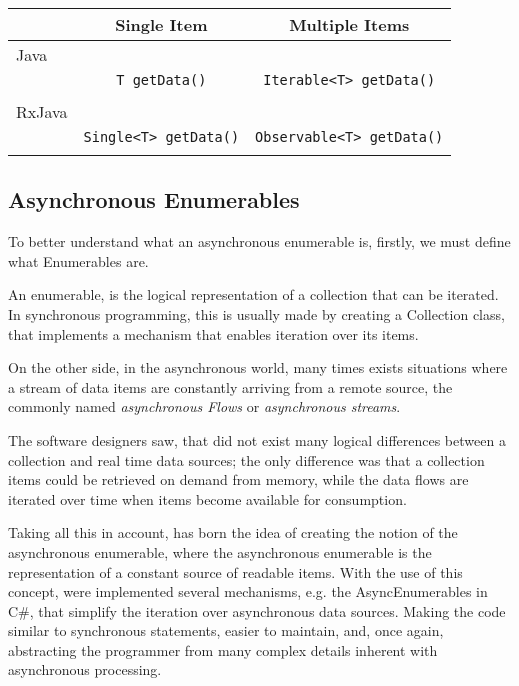 \begin{center}
\begin{tabular}{ |l|c|c| }
\hline
	& Single Item & Multiple Items \\ \hline
	Java & & \\ 
& \texttt{T getData()}  & \texttt{Iterable<T> getData()} \\
	& & \\
	\hline
	RxJava & & \\ 
& \texttt{Single<T> getData()} & \texttt{Observable<T> getData()} \\
	& & \\
	\hline
\end{tabular}
\end{center}


\subsection{Asynchronous Enumerables}
	\label{sec:aenums}
	To better understand what an asynchronous enumerable is, firstly, we must define what Enumerables are. 
	
	An enumerable, is the logical representation of a collection that can be iterated. 
	In synchronous programming, this is usually made by creating a Collection class, that implements a mechanism that enables iteration over its items.
	
	On the other side, in the asynchronous world, many times exists situations where a stream of data items are constantly arriving from a remote source, the commonly named \textit{asynchronous Flows} or \textit{asynchronous streams}. 
	
	The software designers saw, that did not exist many logical differences between a collection and real time data sources; 
	the only difference was that a collection items could be retrieved on demand from memory, while the data flows are iterated over time when items become available for consumption.

	Taking all this in account, has born the idea of creating the notion of the asynchronous enumerable, where the asynchronous enumerable is the representation of a constant source of readable items.
	With the use of this concept, were implemented several mechanisms, e.g. the AsyncEnumerables in C\#, that simplify the iteration over asynchronous data sources. 
	Making the code similar to synchronous statements, easier to maintain, and, once again, abstracting the programmer from many complex details inherent with asynchronous processing.

